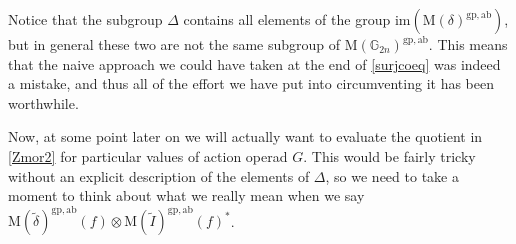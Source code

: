 Notice that the subgroup $\Delta$ contains all elements of the group $\mathrm{im}(\mathrm{M}(\delta)^{\mathrm{gp, ab}})$, but in general these two are not the same subgroup of $\mathrm{M}(\mathbb{G}_{2n})^{\mathrm{gp, ab}}$. This means that the naive approach we could have taken at the end of \cref{surjcoeq} was indeed a mistake, and thus all of the effort we have put into circumventing it has been worthwhile.  

Now, at some point later on we will actually want to evaluate the quotient in \cref{Zmor2} for particular values of action operad $G$. This would be fairly tricky without an explicit description of the elements of $\Delta$, so we need to take a moment to think about what we really mean when we say $\mathrm{M}(\tilde{\delta})^{\mathrm{gp, ab}}(f) \otimes \mathrm{M}(\tilde{I})^{\mathrm{gp, ab}}(f)^*$.

